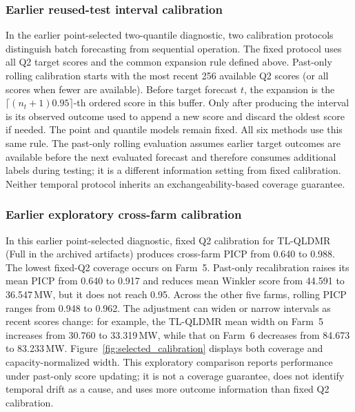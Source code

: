 

\subsubsection{Earlier reused-test interval calibration}
{\color{blue}In the earlier point-selected two-quantile diagnostic, two calibration protocols distinguish batch forecasting from sequential operation. The fixed protocol uses all Q2 target scores and the common expansion rule defined above. Past-only rolling calibration starts with the most recent 256 available Q2 scores (or all scores when fewer are available). Before target forecast $t$, the expansion is the $\lceil(n_t+1)0.95\rceil$-th ordered score in this buffer. Only after producing the interval is its observed outcome used to append a new score and discard the oldest score if needed. The point and quantile models remain fixed. All six methods use this same rule. The past-only rolling evaluation assumes earlier target outcomes are available before the next evaluated forecast and therefore consumes additional labels during testing; it is a different information setting from fixed calibration. Neither temporal protocol inherits an exchangeability-based coverage guarantee.}

\subsubsection{Earlier exploratory cross-farm calibration}
{\color{blue}In this earlier point-selected diagnostic, fixed Q2 calibration for TL-QLDMR (Full in the archived artifacts) produces cross-farm PICP from 0.640 to 0.988. The lowest fixed-Q2 coverage occurs on Farm~5. Past-only recalibration raises its mean PICP from 0.640 to 0.917 and reduces mean Winkler score from 44.591 to 36.547\,MW, but it does not reach 0.95. Across the other five farms, rolling PICP ranges from 0.948 to 0.962. The adjustment can widen or narrow intervals as recent scores change: for example, the TL-QLDMR mean width on Farm~5 increases from 30.760 to 33.319\,MW, while that on Farm~6 decreases from 84.673 to 83.233\,MW. Figure~\ref{fig:selected_calibration} displays both coverage and capacity-normalized width. This exploratory comparison reports performance under past-only score updating; it is not a coverage guarantee, does not identify temporal drift as a cause, and uses more outcome information than fixed Q2 calibration.}

